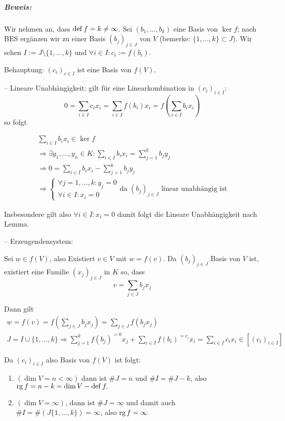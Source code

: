 \subparagraph{Beweis: }
	Wir nehmen an, dass $ \operatorname{def} f = k \neq \infty $.
	Sei $ (b_1,...,b_k) $ eine Basis von $ \ker f $;
	nach BES ergänzen wir zu einer Basis $ (b_j)_{j\in J} $ von $ V $ (bemerke: $ \{1,...,k\}\subset J $).
	Wir sehen $ I:= J\setminus \{1,...,k\} $ und $ \forall i\in I: c_i := f(b_i) $.
	
	Behauptung: $(c_i)_{c\in I}$ ist eine Basis von $f(V)$.
	
	-- Lineare Unabhängigkeit: gilt für eine Linearkombination in $(c_i)_{i\in I}$:
	\begin{equation*}
		0=\sum_{i\in I}c_ix_i = \sum_{i\in I}f(b_i)x_i = f(\sum_{i\in I}b_ix_i)
	\end{equation*}
	so folgt
	
	\begin{gather*}
		\sum_{i\in I}b_ix_i \in \ker f\\
		\Rightarrow \exists y_1,...,y_n\in K:\sum_{i\in I}b_ix_i=\sum_{j=1}^{k}b_jy_j\\
		\Rightarrow 0 = \sum_{i\in I}b_ix_i - \sum_{j=1}^{k}b_jy_j\\
		\Rightarrow
		\begin{cases}
			\forall j = 1, ... ,k:y_j=0\\
			\forall i\in I: x_i = 0
		\end{cases}
		\text{da $(b_j)_{j\in J}$ linear unabhängig ist}
	\end{gather*}
			
	Insbesondere gilt also $\forall i\in I: x_i = 0$ damit folgt die Lineare Unabhängigkeit nach Lemma.
	
	-- Erzeugendensystem:
	
	Sei $w\in f(V)$, also Existiert $v\in V$ mit $w = f(v)$. Da $(b_j)_{j\in J}$ Basis von $V$ ist, existiert eine Familie $(x_j)_{j\in J}$ in $K$ so, dass 
	\begin{equation*}
		v = \sum_{j\in J} b_jx_j
	\end{equation*}
	
	Dann gilt
	\begin{gather*}
		w = f(v) = f(\sum_{j\in J} b_jx_j) = \sum_{j\in J}f(b_jx_j)\\
		J=I \cup\{{1,...,k\}} \Rightarrow \sum_{j=1}^{k}f(b_j)^{=0}x_j + \sum_{i\in I}f(b_i)^{=c_i}x_i = \sum_{i\in I}c_ix_i\in[(c_i)_{i\in I}]
	\end{gather*}
			
	Da $(c_i)_{i\in I}$ also Basis von $f(V)$ ist folgt:
			
	\begin{enumerate}[1.{ Fall}]
		\item $(\dim V = n<\infty)$ dann ist $\# J = n$ und $\# I = \# J-k$, also $\operatorname{rg} f = n-k = \dim V - \operatorname{def} f.$\\
		\item $(\dim V = \infty)$, dann ist $\# J = \infty $ und damit auch $\#I =\#(J\{{1,...,k\}})=\infty $, also $\operatorname{rg} f= \infty$
	\end{enumerate}
	
